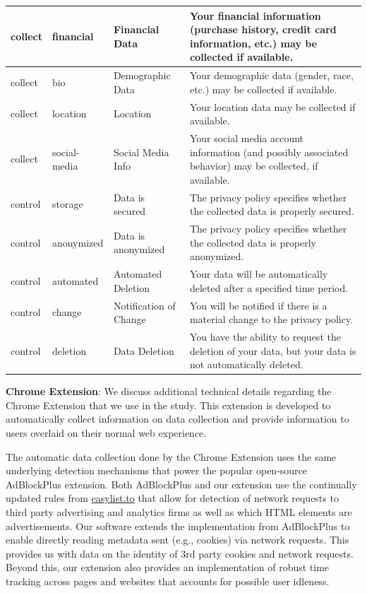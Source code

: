 \documentclass[12pt]{article}
\theoremstyle{definition}
\theoremstyle{remark}
\begin{document}
\begin{appendix}
\begin{table}[H]
{\begin{tabular}{|p{}|p{}|p{}|p{}|}
    \hline
    collect & financial & Financial Data & Your financial information (purchase history, credit card information, etc.) may be collected if available. \\
    \hline
    collect & bio & Demographic Data & Your demographic data (gender, race, etc.) may be collected if available. \\
    \hline
    collect & location & Location & Your location data may be collected if available. \\
    \hline
    collect & social-media & Social Media Info & Your social media account information (and possibly associated behavior) may be collected, if available. \\
    \hline
    control & storage & Data is secured & The privacy policy specifies whether the collected data is properly secured. \\
    \hline
    control & anonymized & Data is anonymized & The privacy policy specifies whether the collected data is properly anonymized. \\
    \hline
    control & automated & Automated Deletion & Your data will be automatically deleted after a specified time period. \\
    \hline
    control & change & Notification of Change & You will be notified if there is a material change to the privacy policy. \\
    \hline
    control & deletion & Data Deletion & You have the ability to request the deletion of your data, but your data is not automatically deleted. \\
    \hline
  \end{tabular}
  }
\end{table}

\noindent \textbf{Chrome Extension}: We discuss additional technical details regarding the Chrome Extension that we use in the study. This extension is developed to automatically collect information on data collection and provide information to users overlaid on their normal web experience.

The automatic data collection done by the Chrome Extension uses the same underlying detection mechanisms that power the popular open-source AdBlockPlus extension. Both AdBlockPlus and our extension use the continually updated rules from \url{easylist.to} that allow for detection of network requests to third party advertising and analytics firms as well as which HTML elements are advertisements. Our software extends the implementation from AdBlockPlus to enable directly reading metadata sent (e.g., cookies) via network requests. This provides us with data on the identity of 3rd party cookies and network requests. Beyond this, our extension also provides an implementation of robust time tracking across pages and websites that accounts for possible user idleness.


\end{appendix}
\end{document}
